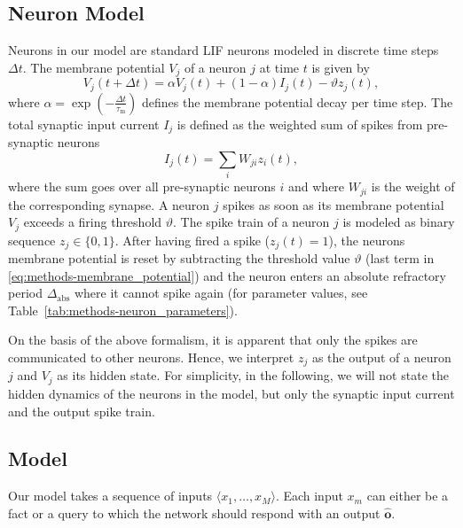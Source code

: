 \documentclass{article}
\newcommand{\vm}[1]{\bm{#1}}
\begin{document}
\subsection{Neuron Model}
\label{sec:methods-neuron_model}
Neurons in our model are standard \gls{LIF} neurons modeled in discrete time steps $\Delta t$. The membrane potential $V_j$ of a neuron $j$ at time $t$ is given by
\begin{equation}\label{eq:methods-membrane_potential}
    V_j(t + \Delta t) = \alpha V_j(t) + (1 - \alpha) I_j(t) - \vartheta z_j(t),
\end{equation}
where $\alpha = \exp(-\frac{\Delta t}{\tau_{\mathrm{m}}})$ defines the membrane potential decay per time step. The total synaptic input current $I_j$ is defined as the weighted sum of spikes from pre-synaptic neurons
\begin{equation}\label{eq:methods-syn_current}
    I_j(t) = \sum_i W_{ji} z_i(t),
\end{equation}
where the sum goes over all pre-synaptic neurons $i$ and where $W_{ji}$ is the weight of the corresponding synapse. A neuron $j$ spikes as soon as its membrane potential $V_j$ exceeds a firing threshold $\vartheta$. The spike train of a neuron $j$ is modeled as binary sequence $z_j \in \{0, 1\}$. After having fired a spike ($z_j(t) = 1$), the neurons membrane potential is reset by subtracting the threshold value $\vartheta$ (last term in \eqref{eq:methods-membrane_potential}) and the neuron enters an absolute refractory period $\Delta_{\mathrm{abs}}$ where it cannot spike again (for parameter values, see Table~\ref{tab:methods-neuron_parameters}).

On the basis of the above formalism, it is apparent that only the spikes are communicated to other neurons. Hence, we interpret $z_j$ as the output of a neuron $j$ and $V_j$ as its hidden state. For simplicity, in the following, we will not state the hidden dynamics of the neurons in the model, but only the synaptic input current and the output spike train.

\subsection{Model}
\label{sec:methods-model}
Our model takes a sequence of inputs $\langle x_1, \dots, x_M \rangle$. Each input $x_m$ can either be a fact or a query to which the network should respond with an output $\hat{\vm{o}}$.
\end{document}
